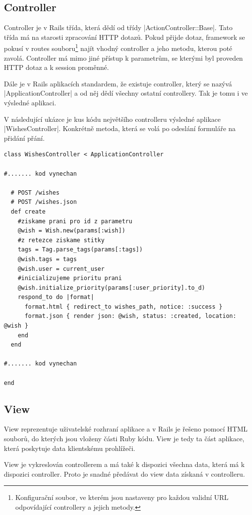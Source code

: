 \subsection{Controller}
Controller je v Rails třída, která dědí od třídy |ActionController::Base|. Tato třída má na starosti zpracování HTTP dotazů. Pokud přijde dotaz, framework se pokusí v routes souboru\footnote{Konfigurační soubor, ve kterém jsou nastaveny pro každou validní URL odpovídající controllery a jejich metody.} najít vhodný controller a jeho metodu, kterou poté zavolá. Controller má mimo jiné přístup k parametrům, se kterými byl proveden HTTP dotaz a k session proměnné.

Dále je v Rails aplikacích standardem, že existuje controller, který se nazývá |ApplicationController| a od něj dědí všechny ostatní controllery. Tak je tomu i ve výsledné aplikaci.

V následující ukázce je kus kódu největšího controlleru výsledné aplikace |WishesController|. Konkrétně metoda, která se volá po odeslání formuláře na přidání přání.

\lstset{language = ruby, style=custom}
\begin{lstlisting}
class WishesController < ApplicationController

#....... kod vynechan

  # POST /wishes
  # POST /wishes.json
  def create
    #ziskame prani pro id z parametru
    @wish = Wish.new(params[:wish])
    #z retezce ziskame stitky
    tags = Tag.parse_tags(params[:tags])
    @wish.tags = tags
    @wish.user = current_user
    #inicializujeme prioritu prani
    @wish.initialize_priority(params[:user_priority].to_d)
    respond_to do |format|
      format.html { redirect_to wishes_path, notice: :success }
      format.json { render json: @wish, status: :created, location: @wish }
    end
  end

#....... kod vynechan

end
\end{lstlisting}

\subsection{View}
View reprezentuje uživatelské rozhraní aplikace a v Rails je řešeno pomocí HTML souborů, do kterých jsou vloženy části Ruby kódu. View  je tedy ta část aplikace, která poskytuje data klientskému prohlížeči.

View je vykreslován controllerem a má také k dispozici všechna data, která má k dispozici controller. Proto je snadné předávat do view data získaná v controlleru.

